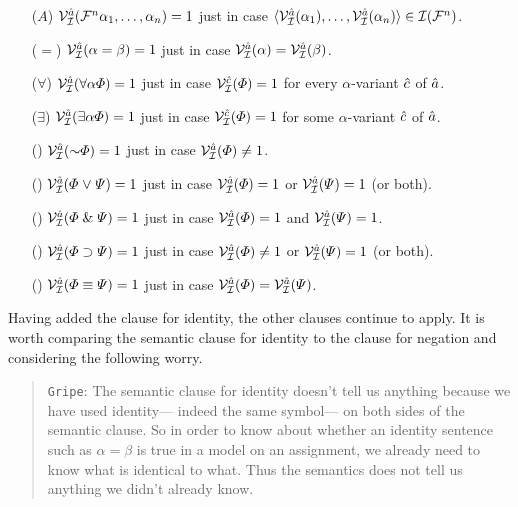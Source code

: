 \begin{enumerate}[labelsep=.15in]
  \item[($A$)] $\mathcal{V}_{\mathcal{I}}^{\hat{a}}(\mathcal{F}^n\alpha_1,\ldots,\alpha_n)=1$ just in case $\langle\mathcal{V}_{\mathcal{I}}^{\hat{a}}{(\alpha_1)},\ldots,\mathcal{V}_{\mathcal{I}}^{\hat{a}}{(\alpha_n)}\rangle\in\mathcal{I}(\mathcal{F}^n)$.
  \item[($=$)] $\mathcal{V}_{\mathcal{I}}^{\hat{a}}(\alpha=\beta)=1$ just in case $\mathcal{V}_{\mathcal{I}}^{\hat{a}}(\alpha)=\mathcal{V}_{\mathcal{I}}^{\hat{a}}(\beta)$.
  \item[(\hspace{1pt}$\forall$\hspace{1pt})] $\mathcal{V}_{\mathcal{I}}^{\hat{a}}(\forall \alpha\varPhi)=1$ just in case $\mathcal{V}_{\mathcal{I}}^{\hat{c}}(\varPhi)=1$ for every $\alpha$-variant $\hat{c}$ of $\hat{a}$.
  \item[(\hspace{1pt}$\exists$\hspace{1pt})] $\mathcal{V}_{\mathcal{I}}^{\hat{a}}(\exists \alpha\varPhi)=1$ just in case $\mathcal{V}_{\mathcal{I}}^{\hat{c}}(\varPhi)=1$ for some $\alpha$-variant $\hat{c}$ of $\hat{a}$.
  \item[(\enot)] $\VV{\I}{\va{a}}(\enot\metaA{})=1$ just in case $\mathcal{V}_{\mathcal{I}}^{\hat{a}}(\varPhi{})\neq 1$.
  \item[(\eor)] $\mathcal{V}_{\mathcal{I}}^{\hat{a}}(\varPhi{} \mkern1mu\vee\mkern1mu \varPsi{})=1$ just in case $\mathcal{V}_{\mathcal{I}}^{\hat{a}}(\varPhi{})=1$ or $\mathcal{V}_{\mathcal{I}}^{\hat{a}}(\varPsi{})=1$ (or both).
  \item[(\eand)] $\mathcal{V}_{\mathcal{I}}^{\hat{a}}(\varPhi{} \mathrel\& \varPsi{})=1$ just in case $\mathcal{V}_{\mathcal{I}}^{\hat{a}}(\varPhi{})=1$ and $\mathcal{V}_{\mathcal{I}}^{\hat{a}}(\varPsi{})=1$.
  \item[(\eif)] $\mathcal{V}_{\mathcal{I}}^{\hat{a}}(\varPhi{} \supset \varPsi{})=1$ just in case $\mathcal{V}_{\mathcal{I}}^{\hat{a}}(\varPhi{})\neq 1$ or $\mathcal{V}_{\mathcal{I}}^{\hat{a}}(\varPsi{})=1$ (or both).
  \item[(\eiff)] $\mathcal{V}_{\mathcal{I}}^{\hat{a}}(\varPhi{} \equiv \varPsi{})=1$ just in case $\mathcal{V}_{\mathcal{I}}^{\hat{a}}(\varPhi{})=\mathcal{V}_{\mathcal{I}}^{\hat{a}}(\varPsi{})$.
\end{enumerate}

Having added the clause for identity, the other clauses continue to apply.
It is worth comparing the semantic clause for identity to the clause for negation and considering the following worry.

\begin{quote}
  \texttt{Gripe}:
  The semantic clause for identity doesn't tell us anything because we have used identity--- indeed the same symbol--- on both sides of the semantic clause.
  So in order to know about whether an identity sentence such as $\alpha=\beta$ is true in a model on an assignment, we already need to know what is identical to what.
  Thus the semantics does not tell us anything we didn't already know.
\end{quote}


